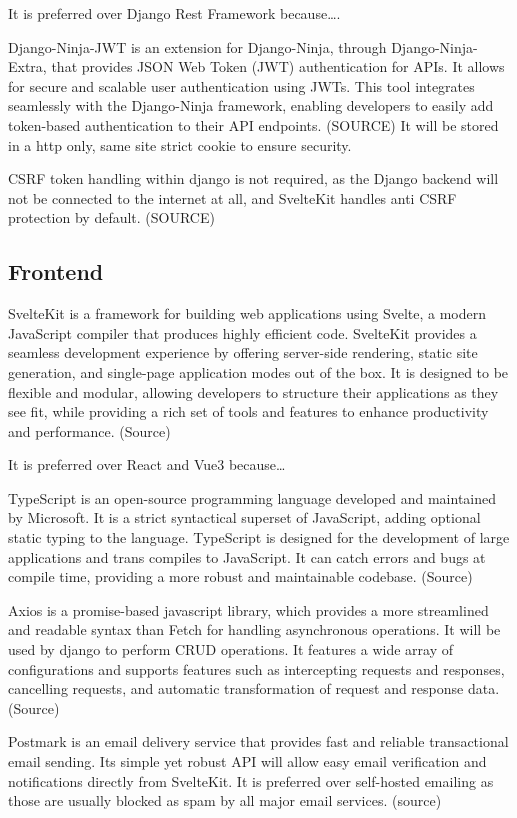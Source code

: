 \begin{multicols}{2}
It is preferred over Django Rest Framework because….

Django-Ninja-JWT is an extension for Django-Ninja, through Django-Ninja-Extra, that provides JSON Web Token (JWT) authentication for APIs. It allows for secure and scalable user authentication using JWTs. This tool integrates seamlessly with the Django-Ninja framework, enabling developers to easily add token-based authentication to their API endpoints. (SOURCE) It will be stored in a http only, same site strict cookie to ensure security. 

CSRF token handling within django is not required, as the Django backend will not be connected to the internet at all, and SvelteKit handles anti CSRF protection by default. (SOURCE)

\subsection{Frontend}
SvelteKit is a framework for building web applications using Svelte, a modern JavaScript compiler that produces highly efficient code. SvelteKit provides a seamless development experience by offering server-side rendering, static site generation, and single-page application modes out of the box. It is designed to be flexible and modular, allowing developers to structure their applications as they see fit, while providing a rich set of tools and features to enhance productivity and performance. (Source)

It is preferred over React and Vue3 because…

TypeScript is an open-source programming language developed and maintained by Microsoft. It is a strict syntactical superset of JavaScript, adding optional static typing to the language. TypeScript is designed for the development of large applications and trans compiles to JavaScript. It can catch errors and bugs at compile time, providing a more robust and maintainable codebase. (Source)


Axios is a promise-based javascript library, which provides a more streamlined and readable syntax than Fetch for handling asynchronous operations. It will be used by django to perform CRUD operations. It features a wide array of configurations and supports features such as intercepting requests and responses, cancelling requests, and automatic transformation of request and response data. (Source)

Postmark is an email delivery service that provides fast and reliable transactional email sending. Its simple yet robust API will allow easy email verification and notifications directly from SvelteKit. It is preferred over self-hosted emailing as those are usually blocked as spam by all major email services. (source)


\end{multicols}
